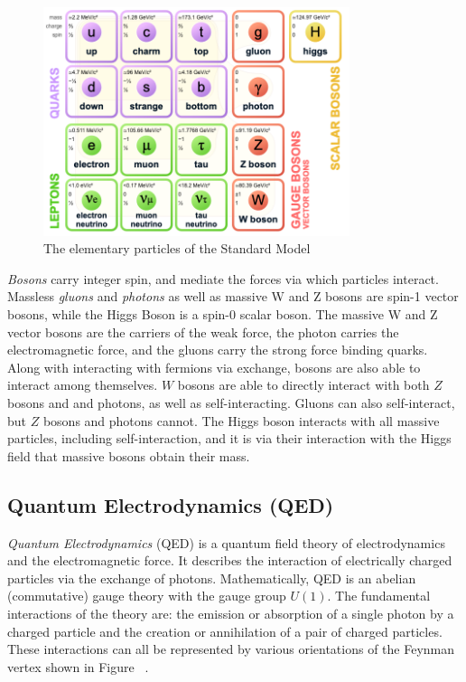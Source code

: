 \begin{figure}[h]
    \centering
    \includegraphics[width=0.8\textwidth]{Figures/1/sm.png}
    \caption{The elementary particles of the Standard Model}
    \label{fig:standardmodel}
\end{figure}

\textit{Bosons} carry integer spin, and mediate the forces via which particles interact. Massless \textit{gluons} and \textit{photons} as well as massive W and Z bosons are spin-1 vector bosons, while the Higgs Boson is a spin-0 scalar boson. The massive W and Z vector bosons are the carriers of the weak force, the photon carries the electromagnetic force, and the gluons carry the strong force binding quarks. Along with interacting with fermions via exchange, bosons are also able to interact among themselves. $W$ bosons are able to directly interact with both $Z$ bosons and and photons, as well as self-interacting. Gluons can also self-interact, but $Z$ bosons and photons cannot. The Higgs boson interacts with all massive particles, including self-interaction, and it is via their interaction with the Higgs field that massive bosons obtain their mass.

\subsection{Quantum Electrodynamics (QED)}
\textit{Quantum Electrodynamics} (QED) is a quantum field theory of electrodynamics and the electromagnetic force. It describes the interaction of electrically charged particles via the exchange of photons. Mathematically, QED is an abelian (commutative) gauge theory with the gauge group $U(1)$. The fundamental interactions of the theory are: the emission or absorption of a single photon by a charged particle and the creation or annihilation of a pair of charged particles. These interactions can all be represented by various orientations of the Feynman vertex shown in Figure ~. 


